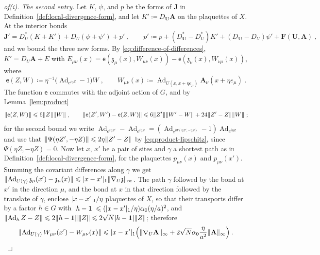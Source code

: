 \documentclass[11pt]{preprint}
\newcommand{\id}{\mathbf 1}
\newcommand{\Ad}{\operatorname{Ad}}
\DeclarePairedDelimiter{\abs}{\lvert}{\rvert}
\DeclarePairedDelimiter{\norm}{\lVert}{\rVert}
\numberwithin{equation}{section}
\begin{document}
\begin{proof}[of(i)]
\emph{The second entry.} Let $K$, $\psi$, and $p$ be the forms of $\mathbf J$ in Definition~\ref{def:local-divergence-form}, and let $K' \coloneqq D_{\mathbf U}\mathbf A$ on the plaquettes of $X$. At the interior bonds
\[
    \mathbf J' = D^*_U(K + K') + D_U(\psi + \psi') + p'\;,
    \qquad
    p' \coloneqq p + (D^*_{\mathbf U} - D^*_U)K' + (D_{\mathbf U} - D_U)\psi' + \mathbf F(\mathbf U, \mathbf A)\;,
\]
and we bound the three new forms. By \eqref{eq:difference-of-differences}, $K' = D_U\mathbf A + E$ with $E_{\mu\nu}(x) = \mathsf e(\mathfrak z_\mu(x), W_{\mu\nu}(x)) - \mathsf e(\mathfrak z_\nu(x), W_{\nu\mu}(x))$, where
\[
    \mathsf e(Z, W) \coloneqq \eta^{-1}\bigl(\Ad_{e^{i\eta Z}} - 1\bigr)W\;,
    \qquad
    W_{\mu\nu}(x) \coloneqq \Ad_{U(x, x + \eta e_\mu)}\mathbf A_\nu(x + \eta e_\mu)\;.
\]
The function $\mathsf e$ commutes with the adjoint action of $G$, and by Lemma~\ref{lem:product}
\[
    \norm{\mathsf e(Z, W)} \leqslant 6\norm Z\norm W\;,
    \qquad
    \norm{\mathsf e(Z', W') - \mathsf e(Z, W)} \leqslant 6\norm{Z'}\norm{W' - W} + 24\norm{Z' - Z}\norm W\;;
\]
for the second bound we write $\Ad_{e^{i\eta Z'}} - \Ad_{e^{i\eta Z}} = (\Ad_{e^{i\Psi(\eta Z', -\eta Z)}} - 1)\Ad_{e^{i\eta Z}}$ and use that $\norm{\Psi(\eta Z', -\eta Z)} \leqslant 2\eta\norm{Z' - Z}$ by \eqref{eq:product-lipschitz}, since $\Psi(\eta Z, -\eta Z) = 0$. Now let $x$, $x'$ be a pair of sites and $\gamma$ a shortest path as in Definition~\ref{def:local-divergence-form}, for the plaquettes $p_{\mu\nu}(x)$ and $p_{\mu\nu}(x')$. Summing the covariant differences along $\gamma$ we get $\norm{\Ad_{U(\gamma)}\mathfrak z_\mu(x') - \mathfrak z_\mu(x)} \leqslant \abs{x - x'}_1\norm{\nabla_U\mathfrak z}_\infty$. The path $\gamma$ followed by the bond at $x'$ in the direction $\mu$, and the bond at $x$ in that direction followed by the translate of $\gamma$, enclose $\abs{x - x'}_1/\eta$ plaquettes of $X$, so that their transports differ by a factor $h \in G$ with $\abs{h - \id} \leqslant (\abs{x - x'}_1/\eta)\alpha_0(\eta/a)^2$, and $\norm{\Ad_hZ - Z} \leqslant 2\norm{h - \id}\norm Z \leqslant 2\sqrt N\abs{h - \id}\norm Z$; therefore
\[
    \norm{\Ad_{U(\gamma)}W_{\mu\nu}(x') - W_{\mu\nu}(x)} \leqslant \abs{x - x'}_1\Bigl(\norm{\nabla_U\mathbf A}_\infty + 2\sqrt N\alpha_0\frac{\eta}{a^2}\norm{\mathbf A}_\infty\Bigr)\;.
\]

\end{proof}
\end{document}
